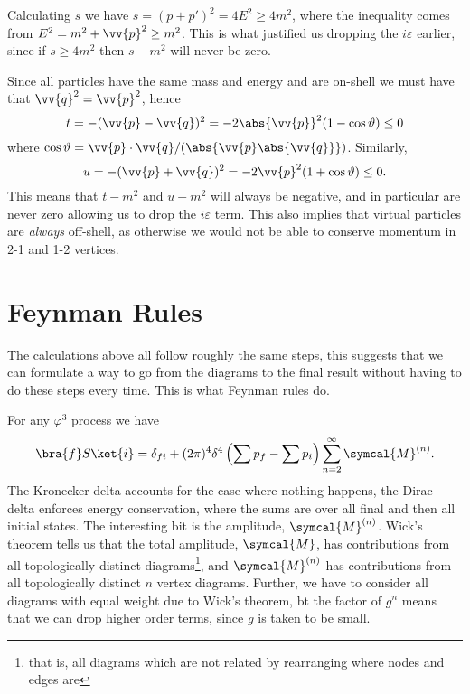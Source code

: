 \documentclass[fleqn]{NotesClass}
\newcommand{\amplitude}{\symcal{M}}
\begin{document}
    Calculating \(s\) we have \(s = (p + p')^2 = 4E^2 \ge 4m^2\), where the inequality comes from \(E^2 = m^2 + \vv{p}^2 \ge m^2\).
    This is what justified us dropping the \(i\varepsilon\) earlier, since if \(s \ge 4m^2\) then \(s - m^2\) will never be zero.
    
    Since all particles have the same mass and energy and are on-shell we must have that \(\vv{q}^2 = \vv{p}^2\), hence
    \begin{equation}
        t = -(\vv{p} - \vv{q})^2 = -2\abs{\vv{p}}^2(1 - \cos \vartheta) \le 0
    \end{equation}
    where \(\cos\vartheta = \vv{p} \cdot \vv{q}/(\abs{\vv{p}\abs{\vv{q}}})\).
    Similarly,
    \begin{equation}
        u = -(\vv{p} + \vv{q})^2 = -2\vv{p}^2(1 + \cos\vartheta) \le 0.
    \end{equation}
    This means that \(t - m^2\) and \(u - m^2\) will always be negative, and in particular are never zero allowing us to drop the \(i\varepsilon\) term.
    This also implies that virtual particles are \emph{always} off-shell, as otherwise we would not be able to conserve momentum in 2-1 and 1-2 vertices.
    
    \section{Feynman Rules}
    The calculations above all follow roughly the same steps, this suggests that we can formulate a way to go from the diagrams to the final result without having to do these steps every time.
    This is what Feynman rules do.
    
    For any \(\varphi^3\) process we have
    \begin{equation}
        \bra{f} S \ket{i} = \delta_{fi} + (2\pi)^4 \delta^4\left( \sum p_f - \sum p_i \right) \sum_{n = 2}^{\infty} \amplitude^{(n)}.
    \end{equation}
    The Kronecker delta accounts for the case where nothing happens, the Dirac delta enforces energy conservation, where the sums are over all final and then all initial states.
    The interesting bit is the amplitude, \(\amplitude^{(n)}\).
    Wick's theorem tells us that the total amplitude, \(\amplitude\), has contributions from all topologically distinct diagrams\footnote{that is, all diagrams which are not related by rearranging where nodes and edges are}, and \(\amplitude^{(n)}\) has contributions from all topologically distinct \(n\) vertex diagrams.
    Further, we have to consider all diagrams with equal weight due to Wick's theorem, bt the factor of \(g^n\) means that we can drop higher order terms, since \(g\) is taken to be small.
    
\end{document}

